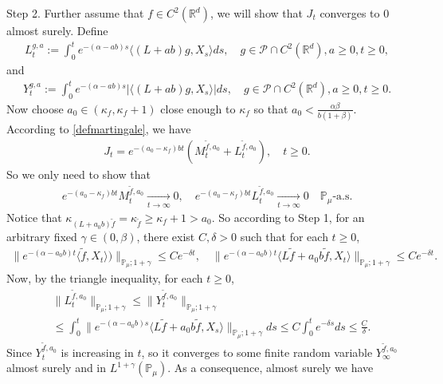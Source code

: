 \documentclass[12pt]{amsart}
\theoremstyle{plain}
\theoremstyle{definition}
\numberwithin{equation}{section}
\begin{document}
	Step 2.
	Further assume that $f\in C^2(\mathbb R^d)$, we will show that $J_t$ converges to $0$ almost surely.
	Define
\begin{align}
	L_t^{g,a}:=\int_0^t e^{-(\alpha-ab)s}\langle (L+ab)g,X_s\rangle ds,
	\quad g\in \mathcal P\cap C^2(\mathbb R^d), a \geq 0, t\geq 0,
\end{align}
and
\begin{align}
    Y_t^{g,a}
    :=\int_0^t e^{-(\alpha-ab)s}|\langle (L+ab)g,X_s\rangle|ds, 
    \quad g\in \mathcal P\cap C^2(\mathbb R^d), a \geq 0, t\geq 0.
\end{align}
	Now choose $a_0 \in (\kappa_{f}, \kappa_f + 1)$ close enough to $\kappa_f$ so that $a_0 < \frac{\alpha \beta}{b(1+\beta)}$. 
	According to \eqref{defmartingale}, we have
\begin{align*}
    J_t
    =e^{-(a_0-\kappa_f)bt} (M_t^{\tilde{f}, a_0}+L_t^{\tilde{f}, a_0}),
    \quad t\geq 0.
\end{align*}
	So we only need to show that
\begin{align*}
    e^{-(a_0-\kappa_f)b t}M_t^{\tilde{f},a_0}
    \xrightarrow[t\to \infty]{} 0, 
    \quad e^{-(a_0-\kappa_f)b t}L_t^{\tilde{f},a_0}
    \xrightarrow[t\to \infty]{} 0 
    \quad \mathbb{P}_{\mu}\text{-a.s.}
\end{align*}
	Notice that $\kappa_{(L+a_0 b)\tilde{f}}=\kappa_{\tilde{f}}\geq \kappa_f+1 > a_0$.
	So according to Step 1, for an arbitrary fixed $\gamma\in (0,\beta)$, there exist $C, \delta>0$ such that for each $t\geq 0$,
\begin{align}
    \|e^{-(\alpha-a_0 b)t}\langle \tilde{f},X_t\rangle)\|_{\mathbb{P}_{\mu};1+\gamma}
    \leq C e^{-\delta t},
    \quad \|e^{-(\alpha-a_0 b)t}\langle L\tilde{f}+a_0 b\tilde{f},X_t\rangle\|_{\mathbb{P}_{\mu};1+\gamma}
    \leq C e^{-\delta t}.
\end{align}
	Now, by the triangle inequality, for each $t\geq 0$,
\begin{align*}
    &\|L_t^{\tilde{f},a_0}\|_{\mathbb{P}_{\mu};1+\gamma}
    \leq\|Y_t^{\tilde{f},a_0}\|_{\mathbb{P}_{\mu};1+\gamma}
    \\&\leq \int_0^t \|e^{-(\alpha-a_0 b)s}\langle L\tilde{f}+a_0 b\tilde{f},X_s\rangle\|_{\mathbb{P}_{\mu};1+\gamma}ds\leq C \int_0^t e^{-\delta s}ds\leq\frac{C}{\delta}.
\end{align*}
Since $Y_t^{\tilde{f},a_0}$ is increasing in $t$, so it converges to some finite random variable $Y_{\infty}^{\tilde{f},a_0}$ almost surely and in $L^{1+\gamma}(\mathbb{P}_{\mu})$.
	As a consequence, almost surely we have
\end{document}
